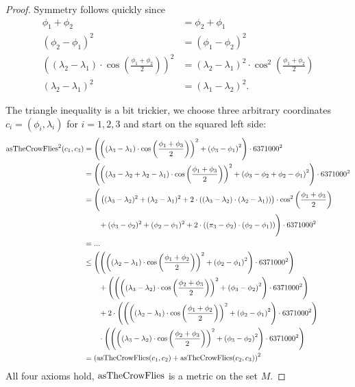 \begin{proof}
		Symmetry follows quickly since
		\begin{align*}
			\phi_1 + \phi_2	&= \phi_2 + \phi_1\\
			(\phi_2 - \phi_1)^2	&= (\phi_1 - \phi_2)^2\\
			\left((\lambda_2 - \lambda_1) \cdot \cos\left(\frac{\phi_1 + \phi_2}{2}\right)\right)^2
				&= (\lambda_2 - \lambda_1)^2 \cdot \cos^2\left(\frac{\phi_1 + \phi_2}{2}\right)\\
			(\lambda_2 - \lambda_1)^2	&= (\lambda_1 - \lambda_2)^2.
		\end{align*}
		
		The triangle inequality is a bit trickier, we choose three arbitrary coordinates $c_i = (\phi_i, \lambda_i)$ for $i = 1, 2, 3$
		and start on the squared left side:
		\begin{align*}
			\operatorname{asTheCrowFlies}^2(c_1, c_3)
				&= \left(\left(\left(\lambda_3 - \lambda_1\right) \cdot \cos\left(\frac{\phi_1 + \phi_3}{2}\right)\right)^2
					+ \left(\phi_3 - \phi_1\right)^2\right) \cdot 6371000^2\\
				&= \left(\left(\left(\lambda_3 - \lambda_2 + \lambda_2 - \lambda_1\right) \cdot \cos\left(\frac{\phi_1 + \phi_3}{2}\right)\right)^2
					+ \left(\phi_3 - \phi_2 + \phi_2 - \phi_1\right)^2\right) \cdot 6371000^2\\
				&= \Bigg(\left((\lambda_3 - \lambda_2)^2 + (\lambda_2 - \lambda_1)^2 + 2 \cdot ((\lambda_3 - \lambda_2) \cdot (\lambda_2 - \lambda_1))\right)
						\cdot \cos^2\left(\frac{\phi_1 + \phi_3}{2}\right)\\
					&\qquad + (\phi_3 - \phi_2)^2 + (\phi_2 - \phi_1)^2 + 2 \cdot ((\pi_3 - \phi_2) \cdot (\phi_2 - \phi_1))\Bigg) \cdot 6371000^2\\
				&= ...\\
				&\le \left(\left(\left(\left(\lambda_2 - \lambda_1\right) \cdot \cos\left(\frac{\phi_1 + \phi_2}{2}\right)\right)^2
						+ \left(\phi_2 - \phi_1\right)^2\right) \cdot 6371000^2\right)\\
					&\qquad+ \left(\left(\left(\left(\lambda_3 - \lambda_2\right) \cdot \cos\left(\frac{\phi_2 + \phi_3}{2}\right)\right)^2
						+ \left(\phi_3 - \phi_2\right)^2\right) \cdot 6371000^2\right)\\
					&\qquad + 2 \cdot \left(\left(\left(\left(\lambda_2 - \lambda_1\right) \cdot \cos\left(\frac{\phi_1 + \phi_2}{2}\right)\right)^2
						+ \left(\phi_2 - \phi_1\right)^2\right) \cdot 6371000^2\right)\\
					&\qquad \cdot \left(\left(\left(\left(\lambda_3 - \lambda_2\right) \cdot \cos\left(\frac{\phi_2 + \phi_3}{2}\right)\right)^2
						+ \left(\phi_3 - \phi_2\right)^2\right) \cdot 6371000^2\right)\\
				&= \left(\operatorname{asTheCrowFlies}(c_1, c_2) + \operatorname{asTheCrowFlies}(c_2, c_3)\right)^2
		\end{align*}
		All four axioms hold, $\operatorname{asTheCrowFlies}$ is a metric on the set $M$.
	\end{proof}